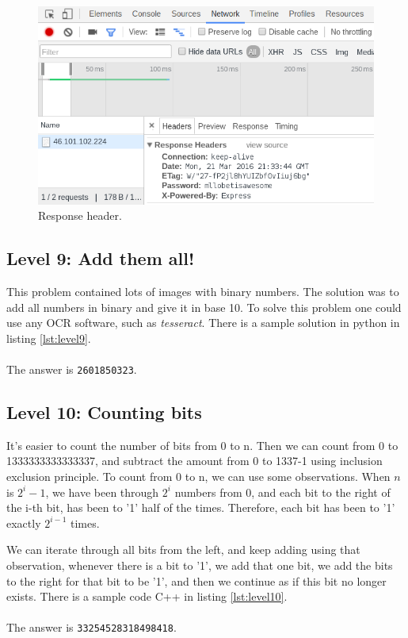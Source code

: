 \documentclass[paper=a4, fontsize=11pt]{scrartcl}	%
\begin{document}
\begin{figure}[H]
\centering
\includegraphics[width=\textwidth]{images/header.png}
\caption{Response header.}
\label{header}
\end{figure}

\subsection*{Level 9: Add them all!}
This problem contained lots of images with binary numbers. The solution was to add all numbers in binary and give it in base 10. To solve this problem one could use any OCR software, such as \textit{tesseract}. There is a sample solution in python in listing \ref{lst:level9}.
\\
\\
The answer is \texttt{2601850323}.



\subsection*{Level 10: Counting bits}
It's easier to count the number of bits from 0 to n. Then we can count from 0 to 1333333333333337, and subtract the amount from 0 to 1337-1 using inclusion exclusion principle. To count from 0 to n, we can use some observations. When $n$ is $2^{i}-1$, we have been through $2^i$ numbers from 0, and each bit to the right of the i-th bit, has been to '1' half of the times. Therefore, each bit has been to '1' exactly $2^{i-1}$ times.

We can iterate through all bits from the left, and keep adding using that observation, whenever there is a bit to '1', we add that one bit, we add the bits to the right for that bit to be '1', and then we continue as if this bit no longer exists. There is a sample code C++ in listing  \ref{lst:level10}. 
\\
\\
The answer is \texttt{33254528318498418}.
\end{document}
